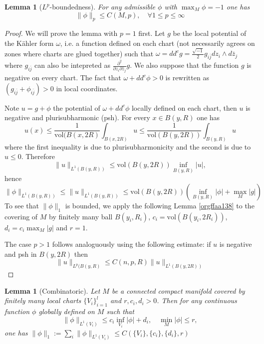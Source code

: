 \documentclass[11pt]{article}
\newtheorem{lemma}[theorem]{Lemma}
\begin{document}
\begin{lemma}[$L^p$-boundedness]
For any admissible \(\phi\) with \(\max_M \phi = -1\) one has
\[
\| \phi\|_p\leq C(M,p),\quad \forall 1\leq p\leq\infty
\]
\end{lemma}

\begin{proof}
We will prove the lemma with \(p=1\) first. Let \(g\) be the local potential of the Kähler form
\(\omega\), i.e. a function defined on each chart (not necessarily agrees on zones where
charts are glued together) such that \(\omega = dd^c g = \frac{\sqrt{-1}}{2}g_{i\bar j}dz_i\wedge d\bar
z_j\) where \(g_{i\bar j}\) can also be intepreted as \(\frac{\partial^2}{\partial z_i \partial\bar z_j}
g\). We also suppose that the function \(g\) is negative on every chart. The fact that \(\omega +
dd^c\phi >0\) is rewritten as \((g_{i\bar j} + \phi_{i\bar j}) >0\) in local coordinates.

Note \(u=g + \phi\) the potential of \(\omega + dd^c\phi\) locally defined on each chart, then \(u\)
is negative and plurisubharmonic (psh). For every \(x\in B(y,R)\) one has
\[
u(x) \leq \frac{1}{\text{vol}(B(x,2R)}\int_{B(x,2R)} u \leq \frac{1}{\text{vol}(B(y,2R))}\int_{B(y,R)}u
\]
where the first inequality is due to plurisubharmonicity and the second is due to \(u\leq
0\). Therefore
\[
\| u\|_{L^1(B(y,R))} \leq \text{vol}(B(y,2R)) \inf_{B(y,R)} |u|,
\]
hence
\[
\|\phi\|_{L^1(B(y,R))} \leq \|u\|_{L^1(B(y,R))} \leq \text{vol}(B(y,2R)) (\inf_{B(y,R)} |\phi| + \max_M |g|)
\]
To see that \(\|\phi\|_1\) is bounded, we apply the following Lemma \ref{orgffaa138} to the covering of \(M\) by
finitely many ball \(B(y_i,R_i)\), \(c_i = \text{vol}(B(y_i,2R_i))\), \(d_i = c_i \max_M |g|\) and
\(r=1\).

The case \(p>1\) follows analoguously using the following estimate: if \(u\) is negative and psh in \(B(y,2R)\) then
\[
\|u \|_{L^{p}(B(y,R)} \leq C(n,p,R)\|u\|_{L^1(B(y,2R))}
\]
\end{proof}

\begin{lemma}[Combinatoric]
\label{lem:combinatoire}
\label{orgffaa138}
Let \(M\) be a connected compact manifold covered by finitely many local charts \(\{V_i\}_{i=1}^{l}\) and
\(r, c_i, d_i>0\). Then for any continuous function \(\phi\) globally
defined on \(M\) such that
\[
\|\phi\|_{L^1(V_i)} \leq c_i \inf_{V_i} |\phi| + d_i,\quad \min_M |\phi| \leq r,
\]
one has \(\|\phi\|_1:= \sum_i \|\phi\|_{L^1(V_i)}\leq C(\{V_i\},\{c_i\}, \{d_i\}, r)\)
\end{lemma}
\end{document}
